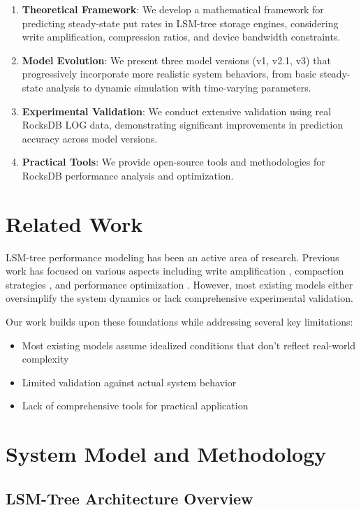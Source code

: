 \documentclass[11pt,twocolumn]{article}
\begin{document}
\begin{enumerate}
    \item \textbf{Theoretical Framework}: We develop a mathematical framework for predicting steady-state put rates in LSM-tree storage engines, considering write amplification, compression ratios, and device bandwidth constraints.
    \item \textbf{Model Evolution}: We present three model versions (v1, v2.1, v3) that progressively incorporate more realistic system behaviors, from basic steady-state analysis to dynamic simulation with time-varying parameters.
    \item \textbf{Experimental Validation}: We conduct extensive validation using real RocksDB LOG data, demonstrating significant improvements in prediction accuracy across model versions.
    \item \textbf{Practical Tools}: We provide open-source tools and methodologies for RocksDB performance analysis and optimization.
\end{enumerate}

\section{Related Work}

LSM-tree performance modeling has been an active area of research. Previous work has focused on various aspects including write amplification \cite{dayan2017lsm}, compaction strategies \cite{luo2019wisc}, and performance optimization \cite{luo2020monkey}. However, most existing models either oversimplify the system dynamics or lack comprehensive experimental validation.

Our work builds upon these foundations while addressing several key limitations:
\begin{itemize}
    \item Most existing models assume idealized conditions that don't reflect real-world complexity
    \item Limited validation against actual system behavior
    \item Lack of comprehensive tools for practical application
\end{itemize}

\section{System Model and Methodology}

\subsection{LSM-Tree Architecture Overview}
\end{document}
